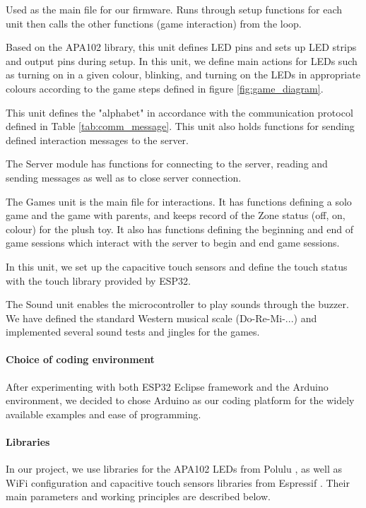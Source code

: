 \begin{description}[align=left]
\item  [NAPaC\_FW.ino] Used as the main file for our firmware. Runs through setup functions for each unit then calls the other functions (game interaction) from the loop. 
\item [LEDs.ino] Based on the APA102 library, this unit defines LED pins and sets up LED strips and output pins during setup. In this unit, we define main actions for LEDs such as turning on in a given colour, blinking, and turning on the LEDs in appropriate colours according to the game steps defined in figure \ref{fig:game_diagram}.
\item[Messages.ino] This unit defines the "alphabet" in accordance with the communication protocol defined in Table \ref{tab:comm_message}. This unit also holds functions for sending defined interaction messages to the server.
\item[Server.ino] The Server module has functions for connecting to the server, reading and sending messages as well as to close server connection. 
\item[Games.ino] The Games unit is the main file for interactions. It has functions defining a solo game and the game with parents, and keeps record of the Zone status (off, on, colour) for the plush toy. It also has functions defining the beginning and end of game sessions which interact with the server to begin and end game sessions.
\item[CapaSens.ino] In this unit, we set up the capacitive touch sensors and define the touch status with the touch library provided by ESP32. 
\item[Sound.ino] The Sound unit enables the microcontroller to play sounds through the buzzer. We have defined the standard Western musical scale (Do-Re-Mi-...) and implemented several sound tests and jingles for the games. 
\end{description}



    \paragraph{Choice of coding environment}
After experimenting with both ESP32 Eclipse framework and the Arduino environment, we decided to chose Arduino as our coding platform for the widely available examples and ease of programming.
    \paragraph{Libraries}
In our project, we use libraries for the APA102 LEDs from Polulu \cite{apa102-arduino}, as well as WiFi configuration and capacitive touch sensors libraries from Espressif \cite{esp32-arduino}. Their main parameters and working principles are described below. 

